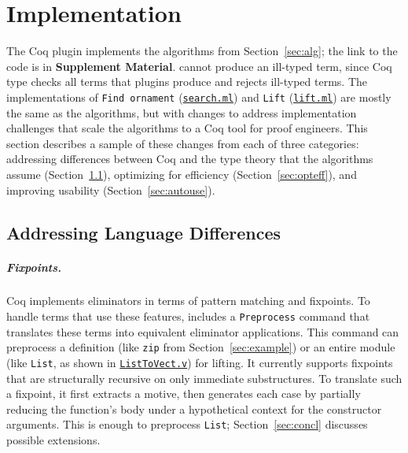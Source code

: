 \section{Implementation}
\label{sec:impl}

The \toolnameb Coq plugin implements the algorithms from Section~\ref{sec:alg};
the link to the code is in \textbf{Supplement Material}. 
\toolnameb cannot produce an ill-typed term, since Coq type checks all terms that plugins produce
and rejects ill-typed terms.
The implementations of 
\lstinline{Find ornament} (\href{http://github.com/uwplse/ornamental-search/blob/itp+equiv/plugin/src/automation/search.ml}{\lstinline{search.ml}}) 
and 
\lstinline{Lift} (\href{http://github.com/uwplse/ornamental-search/blob/itp+equiv/plugin/src/automation/search.ml}{\lstinline{lift.ml}}) 
are mostly the same as the algorithms,
but with changes to address implementation challenges that scale the algorithms to a Coq tool for proof engineers.
This section describes a sample of these changes from each of three categories: 
addressing differences between Coq and the type theory that the algorithms assume (Section~\ref{sec:langdiff}), 
optimizing for efficiency (Section~\ref{sec:opteff}),
and improving usability (Section~\ref{sec:autouse}).

\subsection{Addressing Language Differences}
\label{sec:langdiff}

\subparagraph*{Fixpoints.}
Coq implements eliminators in terms of pattern matching and fixpoints. 
To handle terms that use these features, \toolnameb includes a \lstinline{Preprocess} command that translates these terms into equivalent eliminator applications.
This command can preprocess a definition (like \lstinline{zip} from Section~\ref{sec:example}) or an entire module
(like \lstinline{List}, as shown in \href{http://github.com/uwplse/ornamental-search/blob/itp+equiv/plugin/coq/examples/ListToVect.v}{\lstinline{ListToVect.v}}) for lifting.
It currently supports fixpoints that are structurally recursive on only immediate substructures.
To translate such a fixpoint, it first extracts a motive, then generates each case
by partially reducing the function's body under a hypothetical context for the constructor arguments.
This is enough to preprocess \lstinline{List}; Section~\ref{sec:concl} discusses possible extensions.

